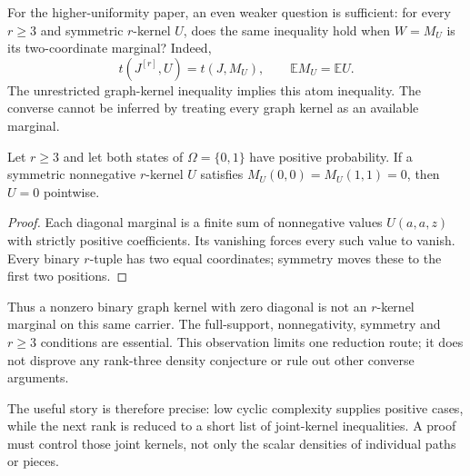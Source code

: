 For the higher-uniformity paper, an even weaker question is sufficient:
for every $r\ge3$ and symmetric $r$-kernel $U$, does the same inequality
hold when $W=M_U$ is its two-coordinate marginal?  Indeed,
\[
 t(J^{[r]},U)=t(J,M_U),\qquad \mathbb E M_U=\mathbb E U.
\]
The unrestricted graph-kernel inequality implies this atom inequality.
The converse cannot be inferred by treating every graph kernel as an
available marginal.

\begin{proposition}
\label{density-binary-marginal-restriction}
Let $r\ge3$ and let both states of $\Omega=\{0,1\}$ have positive
probability.  If a symmetric nonnegative $r$-kernel $U$ satisfies
$M_U(0,0)=M_U(1,1)=0$, then $U=0$ pointwise.
\end{proposition}
\begin{proof}
Each diagonal marginal is a finite sum of nonnegative values
$U(a,a,z)$ with strictly positive coefficients.  Its vanishing forces
every such value to vanish.  Every binary $r$-tuple has two equal
coordinates; symmetry moves these to the first two positions.
\end{proof}

Thus a nonzero binary graph kernel with zero diagonal is not an
$r$-kernel marginal on this same carrier.  The full-support,
nonnegativity, symmetry and $r\ge3$ conditions are essential.  This
observation limits one reduction route; it does not disprove any
rank-three density conjecture or rule out other converse arguments.

The useful story is therefore precise: low cyclic complexity supplies
positive cases, while the next rank is reduced to a short list of
joint-kernel inequalities.  A proof must control those joint kernels,
not only the scalar densities of individual paths or pieces.
